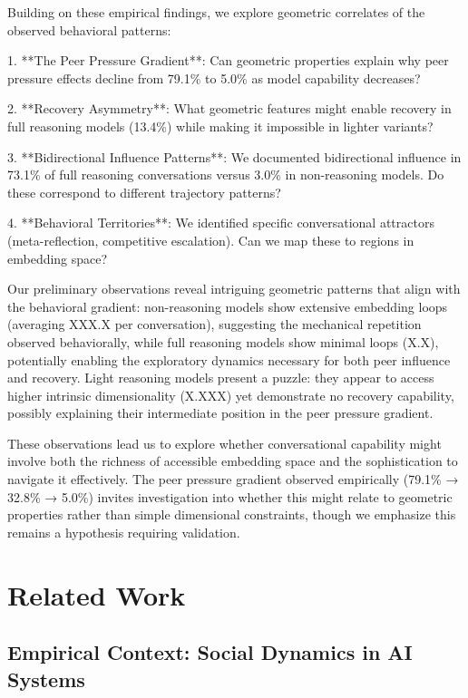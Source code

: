 \documentclass[11pt,letterpaper]{article}
\newcommand{\fullReasoningPeerPressure}{79.1\%}
\newcommand{\lightReasoningPeerPressure}{32.8\%}
\newcommand{\nonReasoningPeerPressure}{5.0\%}
\newcommand{\fullReasoningRecovery}{13.4\%}
\newcommand{\fullBidirectional}{73.1\%}
\newcommand{\nonBidirectional}{3.0\%}
\newcommand{\lightIntrinsicDim}{X.XXX}
\newcommand{\fullLoops}{X.X}
\newcommand{\nonLoops}{XXX.X}
\begin{document}
Building on these empirical findings, we explore geometric correlates of the observed behavioral patterns:

1. **The Peer Pressure Gradient**: Can geometric properties explain why peer pressure effects decline from \fullReasoningPeerPressure{} to \nonReasoningPeerPressure{} as model capability decreases?

2. **Recovery Asymmetry**: What geometric features might enable recovery in full reasoning models (\fullReasoningRecovery{}) while making it impossible in lighter variants?

3. **Bidirectional Influence Patterns**: We documented bidirectional influence in \fullBidirectional{} of full reasoning conversations versus \nonBidirectional{} in non-reasoning models. Do these correspond to different trajectory patterns?

4. **Behavioral Territories**: We identified specific conversational attractors (meta-reflection, competitive escalation). Can we map these to regions in embedding space?

Our preliminary observations reveal intriguing geometric patterns that align with the behavioral gradient: non-reasoning models show extensive embedding loops (averaging \nonLoops{} per conversation), suggesting the mechanical repetition observed behaviorally, while full reasoning models show minimal loops (\fullLoops{}), potentially enabling the exploratory dynamics necessary for both peer influence and recovery. Light reasoning models present a puzzle: they appear to access higher intrinsic dimensionality (\lightIntrinsicDim{}) yet demonstrate no recovery capability, possibly explaining their intermediate position in the peer pressure gradient.

These observations lead us to explore whether conversational capability might involve both the richness of accessible embedding space and the sophistication to navigate it effectively. The peer pressure gradient observed empirically (\fullReasoningPeerPressure{} → \lightReasoningPeerPressure{} → \nonReasoningPeerPressure{}) invites investigation into whether this might relate to geometric properties rather than simple dimensional constraints, though we emphasize this remains a hypothesis requiring validation.

\section{Related Work}

\subsection{Empirical Context: Social Dynamics in AI Systems}
\end{document}
